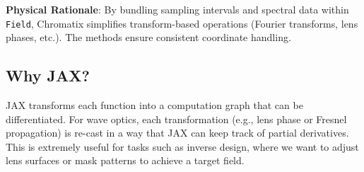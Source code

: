 \documentclass[a4paper,12pt]{report}
\begin{document}
\noindent\textbf{Physical Rationale}: By bundling sampling intervals and spectral data within \texttt{Field}, Chromatix simplifies transform-based operations (Fourier transforms, lens phases, etc.). The methods ensure consistent coordinate handling.

\subsection{Why JAX?}
JAX transforms each function into a computation graph that can be differentiated. For wave optics, each transformation (e.g., lens phase or Fresnel propagation) is re-cast in a way that JAX can keep track of partial derivatives. This is extremely useful for tasks such as inverse design, where we want to adjust lens surfaces or mask patterns to achieve a target field.
\end{document}
